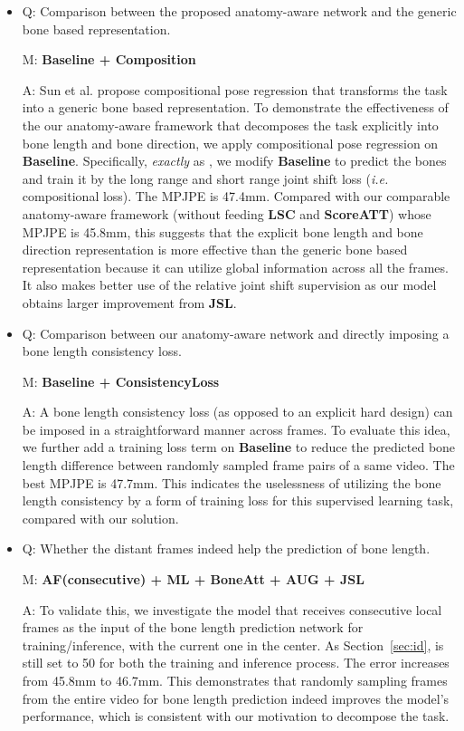 \documentclass[journal]{IEEEtran}
\begin{document}
\begin{itemize}[leftmargin=0.2in]
\setlength\itemsep{0.0em}
\item
Q: Comparison between the proposed anatomy-aware network and the generic bone based representation.

M: \textbf{Baseline + Composition} 

A: Sun et al. \cite{sun2017compositional} propose compositional pose regression that transforms the task into a generic bone based representation. To demonstrate the effectiveness of the our anatomy-aware framework that decomposes the task explicitly into bone length and bone direction, we apply compositional pose regression on \textbf{Baseline}. Specifically, \textit{exactly} as \cite{sun2017compositional}, we modify \textbf{Baseline} to predict the bones and train it by the long range and short range joint shift loss (\emph{i.e.} compositional loss). The MPJPE is 47.4mm. Compared with our comparable anatomy-aware framework (without feeding \textbf{LSC} and \textbf{ScoreATT}) whose MPJPE is 45.8mm, this suggests that the explicit bone length and bone direction representation is more effective than the generic bone based representation because it can utilize global information across all the frames. It also makes better use of the relative joint shift supervision as our model obtains larger improvement from \textbf{JSL}.


\item 
Q: Comparison between our anatomy-aware network and directly imposing a bone length consistency loss.

M: \textbf{Baseline + ConsistencyLoss} 

A: A bone length consistency loss (as opposed to an explicit hard design) can be imposed in a straightforward manner across frames. To evaluate this idea, we further add a training loss term on \textbf{Baseline} to reduce the predicted bone length difference between randomly sampled frame pairs of a same video. The best MPJPE is 47.7mm. This indicates the uselessness of utilizing the bone length consistency by a form of training loss for this supervised learning task, compared with our solution. 


\vspace{-0.00in}
\item 
Q: Whether the distant frames indeed help the prediction of bone length.

M: \textbf{AF(consecutive) + ML + BoneAtt + AUG + JSL} 

A: To validate this, we investigate the model that receives  consecutive local frames as the input of the bone length prediction network for training/inference, with the current one in the center. As Section~\ref{sec:id},  is still set to 50 for both the training and inference process. The error increases from 45.8mm to 46.7mm. This demonstrates that randomly sampling frames from the entire video for bone length prediction indeed improves the model's performance, which is consistent with our motivation to decompose the task. 


\end{itemize}
\end{document}

